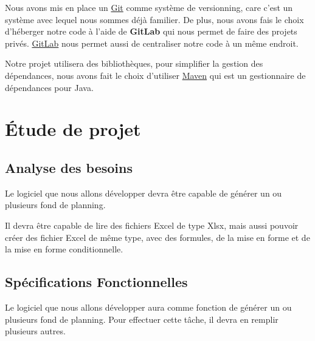 \documentclass{polytech/polytech}
\begin{document}
	Nous avons mis en place un \href{https://git-scm.com/}{Git} comme système de versionning, care c'est un système avec lequel nous sommes déjà familier.
	De plus, nous avons fais le choix d'héberger notre code à l'aide de \textbf{GitLab} qui nous permet de faire des projets privés.
	\href{https://about.gitlab.com/}{GitLab} nous permet aussi de centraliser notre code à un même endroit.

	Notre projet utilisera des bibliothèques, pour simplifier la gestion des dépendances, nous avons fait le choix d'utiliser \href{https://maven.apache.org/}{Maven} qui est un gestionnaire de dépendances pour Java.

	\chapter{Étude de projet}
	\section{Analyse des besoins}

	Le logiciel que nous allons développer devra être capable de générer un ou plusieurs fond de planning.

	Il devra être capable de lire des fichiers Excel de type Xlsx,
	mais aussi pouvoir créer des fichier Excel de même type, avec des formules, de la mise en forme et de la mise en forme conditionnelle.

	\section{Spécifications Fonctionnelles}

	Le logiciel que nous allons développer aura comme fonction de générer un ou plusieurs fond de planning. Pour effectuer cette tâche, il devra en remplir plusieurs autres.
\end{document}
